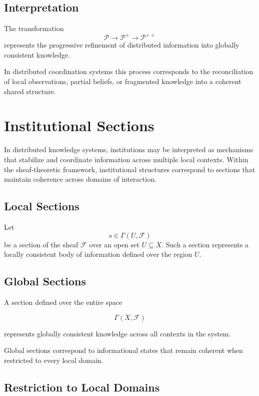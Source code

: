 \documentclass[12pt]{article}
\begin{document}
\subsection{Interpretation}

The transformation
\[
\mathcal{P} \rightarrow \mathcal{P}^+ \rightarrow \mathcal{P}^{++}
\]
represents the progressive refinement of distributed information into globally consistent knowledge.

In distributed coordination systems this process corresponds to the reconciliation of local observations, partial beliefs, or fragmented knowledge into a coherent shared structure.

\section{Institutional Sections}

In distributed knowledge systems, institutions may be interpreted as mechanisms that stabilize and coordinate information across multiple local contexts. Within the sheaf-theoretic framework, institutional structures correspond to sections that maintain coherence across domains of interaction.

\subsection{Local Sections}

Let
\[
s \in \Gamma(U,\mathcal{F})
\]
be a section of the sheaf $\mathcal{F}$ over an open set $U \subseteq X$. Such a section represents a locally consistent body of information defined over the region $U$.

\subsection{Global Sections}

A section defined over the entire space

\[
\Gamma(X,\mathcal{F})
\]

represents globally consistent knowledge across all contexts in the system.

Global sections correspond to informational states that remain coherent when restricted to every local domain.

\subsection{Restriction to Local Domains}
\end{document}
